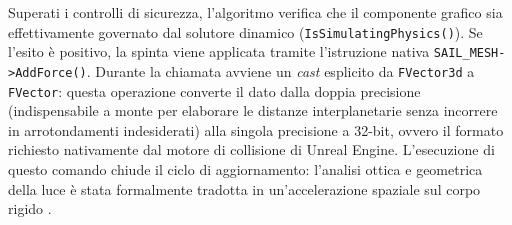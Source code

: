 Superati i controlli di sicurezza, l'algoritmo verifica che il componente grafico sia effettivamente governato dal solutore dinamico (\lstinline|IsSimulatingPhysics()|). Se l'esito è positivo, la spinta viene applicata tramite l'istruzione nativa \lstinline|SAIL_MESH->AddForce()|. Durante la chiamata avviene un \textit{cast} esplicito da \lstinline|FVector3d| a \lstinline|FVector|: questa operazione converte il dato dalla doppia precisione (indispensabile a monte per elaborare le distanze interplanetarie senza incorrere in arrotondamenti indesiderati) alla singola precisione a 32-bit, ovvero il formato richiesto nativamente dal motore di collisione di Unreal Engine. L'esecuzione di questo comando chiude il ciclo di aggiornamento: l'analisi ottica e geometrica della luce è stata formalmente tradotta in un'accelerazione spaziale sul corpo rigido \cite{epicgames_unrealengine, meyers2013cpu}.

